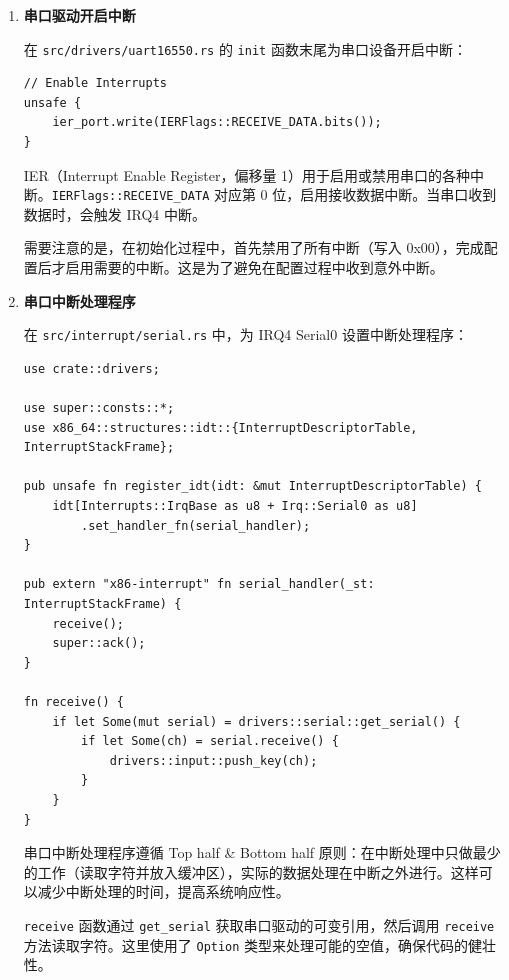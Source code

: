 \documentclass{SYSUReport}
\begin{document}
\begin{enumerate}[label={\chinese*、},labelsep=0pt, start=8]

    \item \textbf{串口驱动开启中断}

    在 \texttt{src/drivers/uart16550.rs} 的 \texttt{init} 函数末尾为串口设备开启中断：

    \begin{verbatim}
// Enable Interrupts
unsafe {
    ier_port.write(IERFlags::RECEIVE_DATA.bits());
}
    \end{verbatim}

    IER（Interrupt Enable Register，偏移量 1）用于启用或禁用串口的各种中断。\texttt{IERFlags::RECEIVE\_DATA} 对应第 0 位，启用接收数据中断。当串口收到数据时，会触发 IRQ4 中断。

    需要注意的是，在初始化过程中，首先禁用了所有中断（写入 0x00），完成配置后才启用需要的中断。这是为了避免在配置过程中收到意外中断。

    \item \textbf{串口中断处理程序}

    在 \texttt{src/interrupt/serial.rs} 中，为 IRQ4 Serial0 设置中断处理程序：

    \begin{verbatim}
use crate::drivers;

use super::consts::*;
use x86_64::structures::idt::{InterruptDescriptorTable, InterruptStackFrame};

pub unsafe fn register_idt(idt: &mut InterruptDescriptorTable) {
    idt[Interrupts::IrqBase as u8 + Irq::Serial0 as u8]
        .set_handler_fn(serial_handler);
}

pub extern "x86-interrupt" fn serial_handler(_st: InterruptStackFrame) {
    receive();
    super::ack();
}

fn receive() {
    if let Some(mut serial) = drivers::serial::get_serial() {
        if let Some(ch) = serial.receive() {
            drivers::input::push_key(ch);
        }
    }
}
    \end{verbatim}

    串口中断处理程序遵循 Top half \& Bottom half 原则：在中断处理中只做最少的工作（读取字符并放入缓冲区），实际的数据处理在中断之外进行。这样可以减少中断处理的时间，提高系统响应性。

    \texttt{receive} 函数通过 \texttt{get\_serial} 获取串口驱动的可变引用，然后调用 \texttt{receive} 方法读取字符。这里使用了 \texttt{Option} 类型来处理可能的空值，确保代码的健壮性。


\end{enumerate}
\end{document}
